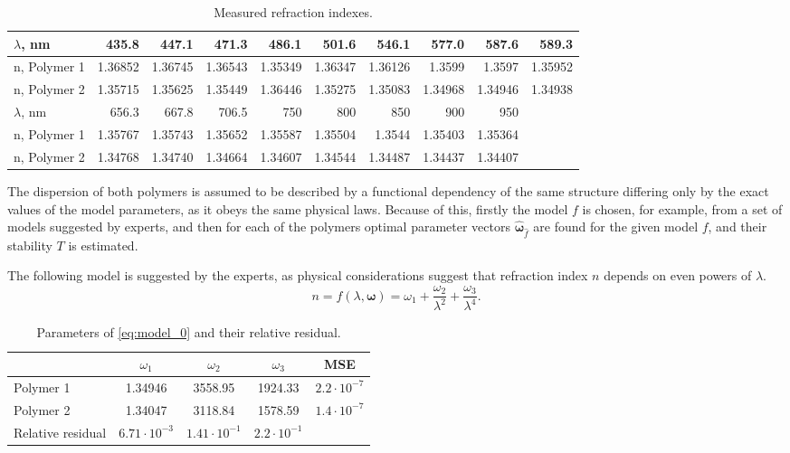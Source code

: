 \documentclass[11pt,a4paper]{article}
\theoremstyle{definition}
\begin{document}
\begin{table}[h]
  \footnotesize
  \caption{Measured refraction indexes.}
  \centering
  \begin{tabular}{| l | r | r | r | r | r | r | r | r | r |} \hline
	$\lambda$, nm	& 435.8		& 447.1		& 471.3		& 486.1		& 501.6		& 546.1		& 577.0		& 587.6		& 589.3		\\ \hline
	n, Polymer 1	& 1.36852	& 1.36745	& 1.36543	& 1.35349	& 1.36347	& 1.36126	& 1.3599	& 1.3597	& 1.35952	\\ \hline
	n, Polymer 2	& 1.35715	& 1.35625	& 1.35449	& 1.36446	& 1.35275	& 1.35083	& 1.34968	& 1.34946	& 1.34938	\\ \hline

	$\lambda$, nm	& 656.3		& 667.8		& 706.5		& 750		& 800		& 850		& 900		& 950		&			\\ \hline
	n, Polymer 1	& 1.35767	& 1.35743	& 1.35652	& 1.35587	& 1.35504	& 1.3544	& 1.35403	& 1.35364	&			\\ \hline
	n, Polymer 2	& 1.34768	& 1.34740	& 1.34664	& 1.34607	& 1.34544	& 1.34487	& 1.34437	& 1.34407	&			\\ \hline
  \end{tabular}
  \label{tabl:source_data}
\end{table}

The dispersion of both polymers is assumed to be described by a functional dependency
of the same structure differing only by the exact values of the model parameters,
as it obeys the same physical laws. Because of this, firstly the model $f$
is chosen, for example, from a set of models suggested by experts, and then
for each of the polymers optimal parameter vectors $\hat{\boldsymbol{\omega}}_{\hat{f}}$
are found for the given model $f$, and their stability $T$ is estimated.

The following model is suggested by the experts, as physical considerations suggest
that refraction index $n$ depends on even powers of $\lambda$.
\begin{equation}
  n = f(\lambda, \boldsymbol{\omega}) = \omega_1 + \frac{\omega_2}{\lambda^2} + \frac{\omega_3}{\lambda^4}.
  \label{eq:model_0}
\end{equation}

\begin{table}[h]
  \centering
  \footnotesize
  \caption{Parameters of \eqref{eq:model_0} and their relative residual.}
  \begin{tabular}{| l | c | c | c | c |} \hline
						& $\omega_1$			& $\omega_2$			& $\omega_3$			& MSE						\\ \hline
    Polymer 1			& 1.34946				& 3558.95				& 1924.33				& $2.2 \cdot 10^{-7}$		\\ \hline
    Polymer 2			& 1.34047				& 3118.84				& 1578.59				& $1.4 \cdot 10^{-7}$		\\ \hline
    Relative residual	& $6.71 \cdot 10^{-3}$	& $1.41 \cdot 10^{-1}$	& $2.2 \cdot 10^{-1}$	&							\\ \hline
  \end{tabular}
  \label{tabl:res_even_coeffs}
\end{table}
\end{document}
